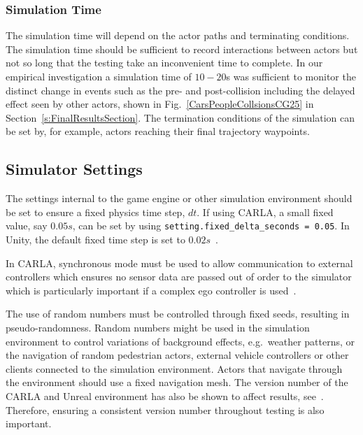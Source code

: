 \documentclass[runningheads,twocolumn,a4paper,10pt]{llncs}
\begin{document}


\subsubsection{Simulation Time} 
The simulation time will depend on the actor paths and terminating conditions. The simulation time should be sufficient to record interactions between actors but not so long that the testing take an inconvenient time to complete. In our empirical investigation a simulation time of $10-20$s was sufficient to monitor the distinct change in events such as the pre- and post-collision including the delayed effect seen by other actors, shown in Fig.~\ref{CarsPeopleCollsionsCG25} in Section~\ref{s:FinalResultsSection}. The termination conditions of the simulation can be set by, for example, actors reaching their final trajectory waypoints. 



\subsection{Simulator Settings}
The settings internal to the game engine or other simulation environment should be set to ensure a fixed physics time step, $dt$. If using CARLA, a small fixed value, say $0.05s$, can be set by using \texttt{setting.fixed\_delta\_seconds = 0.05}. In Unity, the default fixed time step is set to $0.02s$~\cite{MonoBehaviour_unity}. 

In CARLA, synchronous mode must be used to allow communication to external controllers which ensures no sensor data are passed out of order to the simulator which is particularly important if a complex ego controller is used~\cite{carla_sim_config}. 

The use of random numbers must be controlled through fixed seeds, resulting in pseudo-randomness. Random numbers might be used in the simulation environment to control variations of background effects, e.g.\ weather patterns, or the navigation of random pedestrian actors, external vehicle controllers or other clients connected to the simulation environment. 
%
Actors that navigate through the environment should use a fixed navigation mesh. 
%
The version number of the CARLA and Unreal environment has also be shown to affect results, see~\cite{TSLUnrealEngineTesting}. Therefore, ensuring a consistent version number throughout testing is also important.
\end{document}
